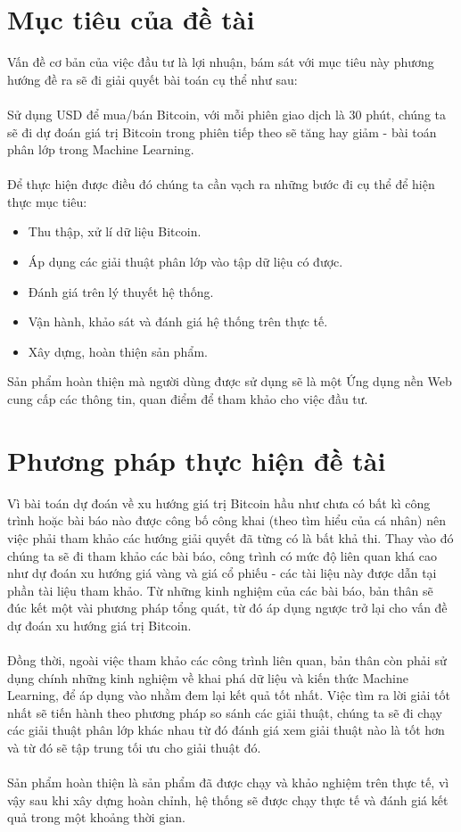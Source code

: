 \section{Mục tiêu của đề tài}
Vấn đề cơ bản của việc đầu tư là lợi nhuận, bám sát với mục tiêu này phương hướng 
đề ra sẽ đi giải quyết bài toán cụ thể như sau:\\\\
Sử dụng USD để mua/bán Bitcoin, với mỗi phiên giao dịch là 30 phút, chúng 
ta sẽ đi dự đoán giá trị Bitcoin trong phiên tiếp theo sẽ tăng hay giảm - bài
toán phân lớp trong Machine Learning.\\\\
Để thực hiện được điều đó chúng ta cần vạch ra những bước đi cụ
thể để hiện thực mục tiêu:
\begin{itemize}
  \item Thu thập, xử lí dữ liệu Bitcoin.
  \item Áp dụng các giải thuật phân lớp vào tập dữ liệu có được.
  \item Đánh giá trên lý thuyết hệ thống.
  \item Vận hành, khảo sát và đánh giá hệ thống trên thực tế.
  \item Xây dựng, hoàn thiện sản phẩm.
\end{itemize} 
Sản phẩm hoàn thiện mà người dùng được sử dụng sẽ là một Ứng dụng nền Web cung 
cấp các thông tin, quan điểm để tham khảo cho việc đầu tư.
\section{Phương pháp thực hiện đề tài}
Vì bài toán dự đoán về xu hướng giá trị Bitcoin hầu như chưa có bất kì 
công trình hoặc bài báo nào được công bố công khai (theo tìm hiểu của cá nhân) 
nên việc phải tham khảo các hướng giải quyết đã từng có là bất khả thi. Thay vào 
đó chúng ta sẽ đi tham khảo các bài báo, công trình có mức độ liên quan khá cao 
như dự đoán xu hướng giá vàng và giá cổ phiếu - các tài liệu này được dẫn tại 
phần tài liệu tham khảo.
Từ những kinh nghiệm của các bài báo, bản thân sẽ đúc kết một vài phương pháp 
tổng quát, từ đó áp dụng ngược trở lại cho vấn đề dự đoán xu hướng giá trị 
Bitcoin.\\\\
Đồng thời, ngoài việc tham khảo các công trình liên quan, bản thân còn phải 
sử dụng chính những kinh nghiệm về khai phá dữ liệu và kiến thức Machine Learning, 
để áp dụng vào nhằm đem lại kết quả tốt nhất. Việc tìm ra lời giải tốt nhất sẽ 
tiến hành theo phương pháp so sánh các giải thuật, chúng ta sẽ đi chạy các giải 
thuật phân lớp khác nhau từ đó đánh giá xem giải thuật nào là tốt hơn và từ đó 
sẽ tập trung tối ưu cho giải thuật đó.\\\\
Sản phẩm hoàn thiện là sản phẩm đã được chạy và khảo nghiệm trên thực tế, vì vậy 
sau khi xây dựng hoàn chỉnh, hệ thống sẽ được chạy thực tế và đánh giá kết quả 
trong một khoảng thời gian.
